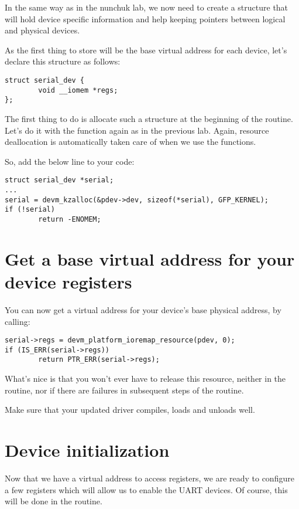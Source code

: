 In the same way as in the nunchuk lab, we now need to create a
structure that will hold device specific information and help
keeping pointers between logical and physical devices.

As the first thing to store will be the base virtual address for
each device, let's declare this structure as follows:

\begin{verbatim}
struct serial_dev {
        void __iomem *regs;
};
\end{verbatim}

The first thing to do is allocate such a structure at the beginning
of the  routine. Let's do it with the 
function again as in the previous lab. Again, resource deallocation is
automatically taken care of when we use the  functions.

So, add the below line to your code:

\begin{verbatim}
struct serial_dev *serial;
...
serial = devm_kzalloc(&pdev->dev, sizeof(*serial), GFP_KERNEL);
if (!serial)
        return -ENOMEM;
\end{verbatim}

\section{Get a base virtual address for your device registers}

You can now get a virtual address for your device's base physical
address, by calling:

\begin{verbatim}
serial->regs = devm_platform_ioremap_resource(pdev, 0);
if (IS_ERR(serial->regs))
        return PTR_ERR(serial->regs);
\end{verbatim}

What's nice is that you won't ever have to release this resource,
neither in the  routine, nor if there are failures
in subsequent steps of the  routine.

Make sure that your updated driver compiles, loads and unloads well.

\section{Device initialization}

Now that we have a virtual address to access registers, we are ready to
configure a few registers which will allow us to enable the UART
devices. Of course, this will be done in the  routine.

